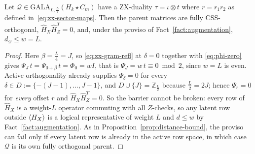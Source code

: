 \begin{corollary}\label{cor:zx-distance}
Let $\mathcal Q\in \mathrm{GALA}_{L,\frac L4}(H_k\star C_m)$ have a ZX-duality $\tau =\iota \otimes t$ where $r= r_1r_2$ as defined in~\eqref{eq:zx-sector-maps}. Then the parent matrices are fully CSS-orthogonal, $\hat H_X\hat H_Z^T = 0$, and, under the proviso of Fact~\ref{fact:augmentation}, $d_\mathcal{Q}\leq w = L$.
\end{corollary}
\begin{proof}
Here $\beta = \frac L4 = J$, so \eqref{eq:zx-gram-refl} at $\delta = 0$ together with \eqref{eq:phi-zero} gives $\Psi_J\, t = \Psi_{0+\beta}\,t = \Phi_0 = wI$, that is $\Psi_J = w\,t \equiv 0 \bmod 2$, since $w = L$ is even. Active orthogonality already supplies $\Psi_\delta = 0$ for every $\delta \in D := \{-(J-1),\dots,J-1\}$, and $D\cup\{J\} = \mathbb Z_{\frac L2}$ because $\frac L2 = 2J$; hence $\Psi_r = 0$ for \emph{every} offset $r$ and $\hat H_X\hat H_Z^T = 0$. So the barrier cannot be broken: every row of $\hat H_X$ is a weight-$L$ operator commuting with all $Z$-checks, so any latent row outside $\langle H_X \rangle$ is a logical representative of weight $L$ and $d\leq w$ by Fact~\ref{fact:augmentation}. As in Proposition~\ref{prop:distance-bound}, the proviso can fail only if every latent row is already in the active row space, in which case $\mathcal Q$ is its own fully orthogonal parent.
\end{proof}


